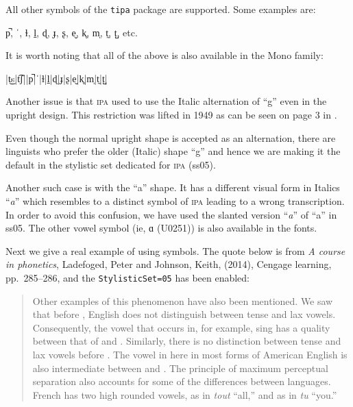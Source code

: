 \documentclass{article}
\newcommand{\acro}{\relax}
\begin{document}
All other symbols of the \verb|tipa| package are supported. Some examples are:
\begin{center}
p̚,  ˈ, ɫ, l̠, ɖ, ɟ, ʂ, e̬, k̥, m̩, t̼, t̺, etc.
\end{center}
It is worth noting that all of the above is also available in the Mono family:
\begin{ttfamily}
\begin{center}
|t͜s|t͡ʃ||p̚|ˈ|ɫ|l̠|ɖ|ɟ|ʂ|e̬|k̥|m̩|t̼|t̺|
\end{center}
\end{ttfamily}

Another issue is that \textsc{ipa} used to use the Italic alternation of ``g'' even in the
upright design. This restriction was lifted in \textsc{1949} as can
be seen on page \textsc{3} in \cite{2}. %

Even though the normal upright shape is accepted as an
alternation, there are linguists who prefer the older
(Italic) shape ``{\ipafont g}'' and hence we are making it the default in the
stylistic set dedicated for \textsc{ipa} (ss05).

Another such case is with the ``a'' shape. It has a different
visual form in Italics ``\textit{a}'' which resembles to a distinct symbol
of \textsc{ipa} leading to a wrong transcription. In order to avoid
this confusion, we have used the slanted version ``{\itshape\ipafont a}'' of ``a'' in
ss05. The other vowel symbol (ie, ɑ (U0251)) is also
available in the fonts.



Next we give a real example of using \acro{\textsc{ipa}} symbols. The quote below is from
\textit{A course in phonetics}, {Ladefoged, Peter and Johnson, Keith}, \textsc{(2014)},
{Cengage learning}, pp.~\textsc{285--286}, and the \texttt{StylisticSet=05} has been enabled:
\begin{quote}
  Other examples of this phenomenon have also been
  mentioned.  We saw that before {\ipafont [ŋ]}, English
  does not distinguish between tense and lax vowels.
  Consequently, the vowel that occurs in, for example, sing
  has a quality between that of {\ipafont [i]} and {\ipafont
    [ɪ]}.  Similarly, there is no distinction between tense
  and lax vowels before {\ipafont [ɹ]}. The vowel in here in
  most forms of American English is also intermediate
  between {\ipafont [i]} and {\ipafont [ɪ]}. The principle
  of maximum perceptual separation also accounts for some of
  the differences between languages. French has two high
  rounded vowels, {\ipafont [u]} as in \emph{tout} {\ipafont
    [t̪u]} ``all,'' and {\ipafont [y]} as in \emph{tu}
  {\ipafont [t̪y]} ``you.''
\end{quote}
\end{document}
